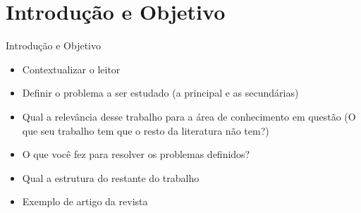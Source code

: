 \section{Introdução e Objetivo}

\begin{frame}	
	\begin{block}{Introdução e Objetivo}
		 \begin{itemize}
			  \item Contextualizar o leitor			
			  \item Definir o problema a ser estudado (a principal e as secundárias)
			  \item Qual a relevância desse trabalho para a área de conhecimento em questão (O que seu trabalho tem que o resto da literatura não tem?)
			  \item O que você fez para resolver os problemas definidos?
			  \item Qual a estrutura do restante do trabalho
			  \item Exemplo de artigo da revista \href{https://www.nature.com/scitable/topicpage/scientific-papers-13815490}{\color{blue}{Nature}} \cite{NATURE_2018}
		  \end{itemize}
	\end{block}
\end{frame}
